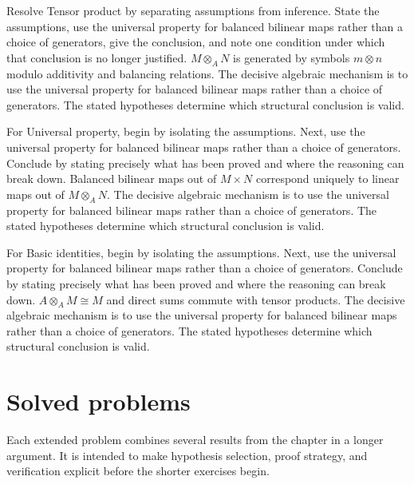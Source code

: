 \begin{example}\label{ex:v10-worked-02}
Resolve Tensor product by separating assumptions from inference. State the assumptions, use the universal property for balanced bilinear maps rather than a choice of generators, give the conclusion, and note one condition under which that conclusion is no longer justified. $M\otimes_A N$ is generated by symbols $m\otimes n$ modulo additivity and balancing relations. The decisive algebraic mechanism is to use the universal property for balanced bilinear maps rather than a choice of generators. The stated hypotheses determine which structural conclusion is valid.
\end{example}

\begin{example}\label{ex:v10-worked-03}
For Universal property, begin by isolating the assumptions. Next, use the universal property for balanced bilinear maps rather than a choice of generators. Conclude by stating precisely what has been proved and where the reasoning can break down. Balanced bilinear maps out of $M\times N$ correspond uniquely to linear maps out of $M\otimes_A N$. The decisive algebraic mechanism is to use the universal property for balanced bilinear maps rather than a choice of generators. The stated hypotheses determine which structural conclusion is valid.
\end{example}

\begin{example}\label{ex:v10-worked-04}
For Basic identities, begin by isolating the assumptions. Next, use the universal property for balanced bilinear maps rather than a choice of generators. Conclude by stating precisely what has been proved and where the reasoning can break down. $A\otimes_A M\cong M$ and direct sums commute with tensor products. The decisive algebraic mechanism is to use the universal property for balanced bilinear maps rather than a choice of generators. The stated hypotheses determine which structural conclusion is valid.
\end{example}

\section{Solved problems}
Each extended problem combines several results from the chapter in a longer argument. It is intended to make hypothesis selection, proof strategy, and verification explicit before the shorter exercises begin.


